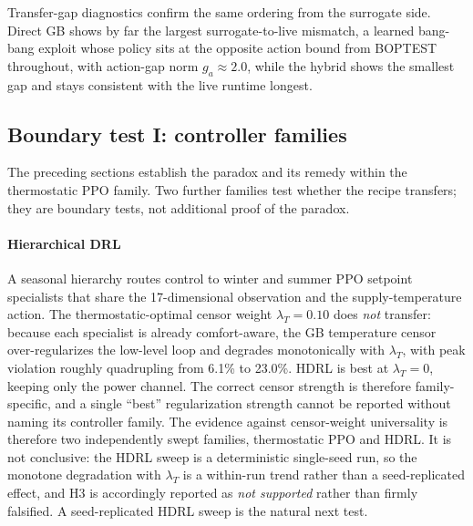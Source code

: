 Transfer-gap diagnostics confirm the same ordering from the surrogate side. Direct GB shows by far
the largest surrogate-to-live mismatch, a learned bang-bang exploit whose policy sits at the
opposite action bound from BOPTEST throughout, with action-gap norm $g_a\approx2.0$, while the
hybrid shows the smallest gap and stays consistent with the live runtime longest.

\subsection{Boundary test I: controller families}\label{sec:families}

The preceding sections establish the paradox and its remedy within the thermostatic PPO family. Two
further families test whether the recipe transfers; they are boundary tests, not additional proof of
the paradox.

\paragraph{Hierarchical DRL}
A seasonal hierarchy routes control to winter and summer PPO setpoint specialists that share the
17-dimensional observation and the supply-temperature action. The thermostatic-optimal censor weight
$\lambda_T=0.10$ does \emph{not} transfer: because each specialist is already comfort-aware, the GB
temperature censor over-regularizes the low-level loop and \ms{} degrades monotonically with
$\lambda_T$, with peak violation roughly quadrupling from 6.1\% to 23.0\%. HDRL is best at
$\lambda_T=0$, keeping only the power channel. The correct censor strength is therefore
family-specific, and a single ``best'' regularization strength cannot be reported without naming its
controller family. The evidence against censor-weight universality is therefore two independently
swept families, thermostatic PPO and HDRL. It is not conclusive: the HDRL sweep is a deterministic
single-seed run, so the monotone degradation with $\lambda_T$ is a within-run trend rather than a
seed-replicated effect, and H3 is accordingly reported as \emph{not supported} rather than firmly
falsified. A seed-replicated HDRL sweep is the natural next test.

